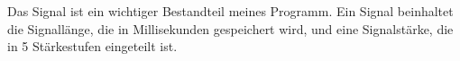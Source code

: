 

Das Signal ist ein wichtiger Bestandteil meines Programm. 
Ein Signal beinhaltet die Signallänge, die in Millisekunden gespeichert wird, und eine Signalstärke, die in 5 Stärkestufen eingeteilt ist. 
